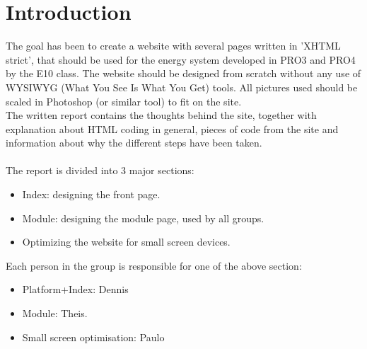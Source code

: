 \chapter{Introduction}
The goal has been to create a website with several pages written in 'XHTML strict', that should be used for the energy system developed in PRO3 and PRO4 by the E10 class. The website should be designed from scratch without any use of WYSIWYG (What You See Is What You Get) tools. All pictures used should be scaled in Photoshop (or similar tool) to fit on the site. \\The written report contains the thoughts behind the site, together with explanation about HTML coding in general, pieces of code from the site and information about why the different steps have been taken. \\
\\
The report is divided into 3 major sections:
\begin{itemize}
	\item Index: designing the front page.
	\item Module: designing the module page, used by all groups.
	\item Optimizing the website for small screen devices.
\end{itemize}
Each person in the group is responsible for one of the above section:
\begin{itemize}
	\item Platform+Index: Dennis
	\item Module: Theis.
	\item Small screen optimisation: Paulo
\end{itemize}
